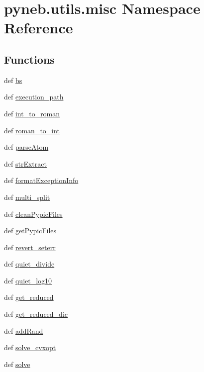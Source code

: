 \hypertarget{namespacepyneb_1_1utils_1_1misc}{\section{pyneb.\-utils.\-misc Namespace Reference}
\label{namespacepyneb_1_1utils_1_1misc}
}
\subsection*{Functions}
\begin{DoxyCompactItemize}
\item 
def \hyperlink{namespacepyneb_1_1utils_1_1misc_acb912d665536c0bc9e48c6d854f8cfbf}{bs}
\item 
def \hyperlink{namespacepyneb_1_1utils_1_1misc_a937fc19e910346d9d288992e8eeab0ea}{execution\-\_\-path}
\item 
def \hyperlink{namespacepyneb_1_1utils_1_1misc_a7a4c4b4ba1c884da72e0ea05aa8fb90b}{int\-\_\-to\-\_\-roman}
\item 
def \hyperlink{namespacepyneb_1_1utils_1_1misc_ae67dbd6bb48d64216bc162ebdc25a183}{roman\-\_\-to\-\_\-int}
\item 
def \hyperlink{namespacepyneb_1_1utils_1_1misc_a2bb6f906a75f26a882093e9ce9272507}{parse\-Atom}
\item 
def \hyperlink{namespacepyneb_1_1utils_1_1misc_aaf9c5249e3c3104e38854ca30f9df4b7}{str\-Extract}
\item 
def \hyperlink{namespacepyneb_1_1utils_1_1misc_ab2eb7efdb086136e683e7f05f17958a9}{format\-Exception\-Info}
\item 
def \hyperlink{namespacepyneb_1_1utils_1_1misc_aa8d55231b0b2a1223bbd3acd3a1268e2}{multi\-\_\-split}
\item 
def \hyperlink{namespacepyneb_1_1utils_1_1misc_a71fea98dc66e2a1793b5c86a345da052}{clean\-Pypic\-Files}
\item 
def \hyperlink{namespacepyneb_1_1utils_1_1misc_aee812eafa08b828b4c65c700a6cf4ff6}{get\-Pypic\-Files}
\item 
def \hyperlink{namespacepyneb_1_1utils_1_1misc_a1274ea579021bda5ae537337b7dacebd}{revert\-\_\-seterr}
\item 
def \hyperlink{namespacepyneb_1_1utils_1_1misc_a852d66d22ba9e872484b3346dc28249e}{quiet\-\_\-divide}
\item 
def \hyperlink{namespacepyneb_1_1utils_1_1misc_a4ab5392913d261532484092f8856a39a}{quiet\-\_\-log10}
\item 
def \hyperlink{namespacepyneb_1_1utils_1_1misc_ae69de9c9e8f8bde114b8edd326f3b993}{get\-\_\-reduced}
\item 
def \hyperlink{namespacepyneb_1_1utils_1_1misc_ad6fc4e32ea4c076ac81e99b5c1e74f13}{get\-\_\-reduced\-\_\-dic}
\item 
def \hyperlink{namespacepyneb_1_1utils_1_1misc_af39dcb3c2627e5f29063e47ca4327f94}{add\-Rand}
\item 
def \hyperlink{namespacepyneb_1_1utils_1_1misc_ae2d7579afe060895b9d6ebc2f4d59d42}{solve\-\_\-cvxopt}
\item 
def \hyperlink{namespacepyneb_1_1utils_1_1misc_aa5d9daf83958e9b6bd123954d495e94c}{solve}
\end{DoxyCompactItemize}
